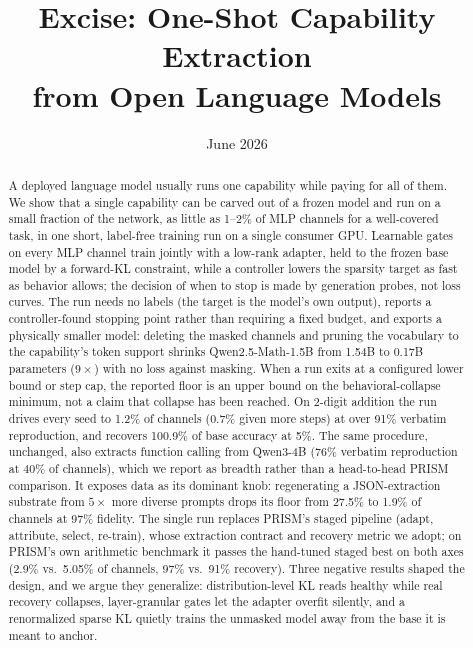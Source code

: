 \documentclass{article}
\title{Excise: One-Shot Capability Extraction \\ from Open Language Models}
\author{}
\date{June 2026}
\begin{document}
\maketitle

\begin{abstract}
A deployed language model usually runs one capability while paying for all of
them. We show that a single capability can be carved out of a frozen model and
run on a small fraction of the network, as little as 1--2\% of MLP channels
for a well-covered task, in one short, label-free training run on a single
consumer GPU. Learnable gates on every MLP channel train jointly with a
low-rank adapter, held to the frozen base model by a forward-KL constraint,
while a controller lowers the sparsity target as fast as behavior allows; the
decision of when to stop is made by generation probes, not loss curves. The
run needs no labels (the target is the model's own output), reports a
controller-found stopping point rather than requiring a fixed budget, and
exports a physically smaller model: deleting the masked channels and pruning
the vocabulary to the capability's token support shrinks
Qwen2.5-Math-1.5B from 1.54B to 0.17B parameters ($9\times$) with no loss
against masking. When a run exits at a configured lower bound or step cap, the
reported floor is an upper bound on the behavioral-collapse minimum, not a
claim that collapse has been reached. On 2-digit addition the run drives every
seed to 1.2\% of channels (0.7\% given more steps) at over 91\% verbatim
reproduction, and recovers 100.9\% of base accuracy at 5\%. The same
procedure, unchanged, also extracts function calling from Qwen3-4B (76\%
verbatim reproduction at 40\% of channels), which we report as breadth rather
than a head-to-head PRISM comparison. It exposes data as its dominant knob:
regenerating a JSON-extraction substrate from $5\times$ more diverse prompts
drops its floor from 27.5\% to 1.9\% of channels at 97\% fidelity. The single
run replaces PRISM's staged pipeline (adapt, attribute, select, re-train),
whose extraction contract and recovery metric we adopt; on PRISM's own
arithmetic benchmark it passes the hand-tuned staged best on both axes (2.9\%
vs.\ 5.05\% of channels, 97\% vs.\ 91\% recovery). Three negative results
shaped the design, and we argue they generalize: distribution-level KL reads
healthy while real recovery collapses, layer-granular gates let the adapter
overfit silently, and a renormalized sparse KL quietly trains the unmasked
model away from the base it is meant to anchor.
\end{abstract}
\end{document}
